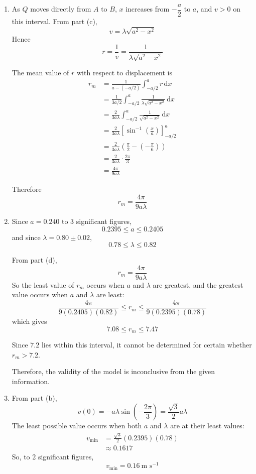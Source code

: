 \documentclass[leqno]{article}
\begin{document}
\begin{enumerate}[
  label=\textbf{\arabic*.},
  leftmargin=*,
  topsep=0pt,
  partopsep=0pt,
  parsep=0pt
]
\begin{tcolorbox}[colback=white, colframe=scarlet, title={\textbf{Solution}}, breakable, grow to left by=6mm, grow to right by=10mm]
\begin{enumerate}[label=\textbf{(\alph*)}]
  Hence
  \[
  v^2=\lambda^2(a^2-x^2)
  \]

  \item As $Q$ moves directly from $A$ to $B$, $x$ increases from $-\dfrac{a}{2}$ to $a$, and $v>0$ on this interval. From part (c),
  \[
  v=\lambda\sqrt{a^2-x^2}
  \]
  Hence
  \[
  r=\frac{1}{v}=\frac{1}{\lambda\sqrt{a^2-x^2}}
  \]

  The mean value of $r$ with respect to displacement is
  \begin{align*}
  r_m&=\frac{1}{a-(-a/2)}\int_{-a/2}^{a} r\,\mathrm{d}x\\
     &=\frac{1}{3a/2}\int_{-a/2}^{a}\frac{1}{\lambda\sqrt{a^2-x^2}}\,\mathrm{d}x\\
     &=\frac{2}{3a\lambda}\int_{-a/2}^{a}\frac{1}{\sqrt{a^2-x^2}}\,\mathrm{d}x\\
     &=\frac{2}{3a\lambda}\left[\sin^{-1}\left(\frac{x}{a}\right)\right]_{-a/2}^{a}\\
     &=\frac{2}{3a\lambda}\left(\frac{\pi}{2}-\left(-\frac{\pi}{6}\right)\right)\\
     &=\frac{2}{3a\lambda}\cdot \frac{2\pi}{3}\\
     &=\frac{4\pi}{9a\lambda}
  \end{align*}

  Therefore
  \[
  r_m=\frac{4\pi}{9a\lambda}
  \]

  \item Since $a=0.240$ to 3 significant figures,
  \[
  0.2395\le a\le 0.2405
  \]
  and since $\lambda=0.80\pm 0.02$,
  \[
  0.78\le \lambda\le 0.82
  \]

  From part (d),
  \[
  r_m=\frac{4\pi}{9a\lambda}
  \]
  So the least value of $r_m$ occurs when $a$ and $\lambda$ are greatest, and the greatest value occurs when $a$ and $\lambda$ are least:
  \[
  \frac{4\pi}{9(0.2405)(0.82)}\le r_m\le \frac{4\pi}{9(0.2395)(0.78)}
  \]
  which gives
  \[
  7.08\le r_m\le 7.47
  \]

  Since $7.2$ lies within this interval, it cannot be determined for certain whether $r_m>7.2$.

  Therefore, the validity of the model is inconclusive from the given information.

  \item From part (b),
  \[
  v(0)=-a\lambda \sin\left(-\frac{2\pi}{3}\right)=\frac{\sqrt{3}}{2}a\lambda
  \]
  The least possible value occurs when both $a$ and $\lambda$ are at their least values:
  \begin{align*}
  v_{\min}&=\frac{\sqrt{3}}{2}(0.2395)(0.78)\\
          &\approx 0.1617
  \end{align*}
  So, to 2 significant figures,
  \[
  v_{\min}=0.16\ \text{m s}^{-1}
  \]
\end{enumerate}
\end{tcolorbox}



\end{enumerate}
\end{document}
